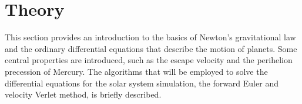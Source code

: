 \documentclass[%
reprint,nofootinbib,
amsmath,amssymb,
aps,
]{revtex4-1}
\begin{document}
\onecolumngrid 

\section{Theory} \vspace{5mm}

\twocolumngrid 

\noindent 
This section provides an introduction to the basics of Newton's gravitational law and the ordinary differential equations that describe the motion of planets. Some central properties are introduced, such as the escape velocity and the perihelion precession of Mercury. The algorithms that will be employed to solve the differential equations for the solar system simulation, the forward Euler and velocity Verlet method, is briefly described. \\
\end{document}
